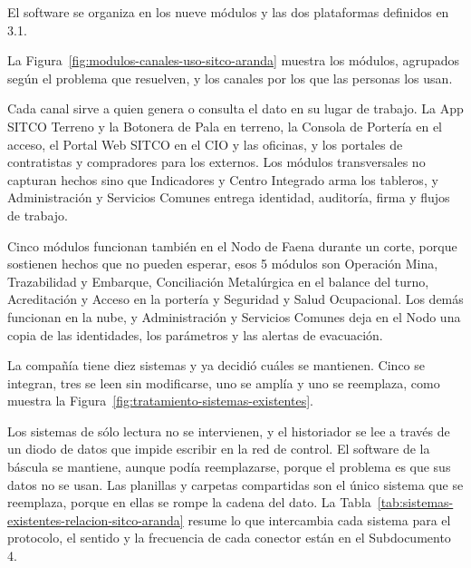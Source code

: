 \documentclass[subdoc]{../../comun/overfore}
\begin{document}
El software se organiza en los nueve módulos y las dos plataformas definidos en 3.1.

La Figura~\ref{fig:modulos-canales-uso-sitco-aranda} muestra los módulos, agrupados según el problema que resuelven, y los canales por los que las personas los usan.

\begin{horizontal}
\end{horizontal}
Cada canal sirve a quien genera o consulta el dato en su lugar de trabajo. La App SITCO Terreno y la Botonera de Pala en terreno, la Consola de Portería en el acceso, el Portal Web SITCO en el CIO y las oficinas, y los portales de contratistas y compradores para los externos. Los módulos transversales no capturan hechos sino que Indicadores y Centro Integrado arma los tableros, y Administración y Servicios Comunes entrega identidad, auditoría, firma y flujos de trabajo.

Cinco módulos funcionan también en el Nodo de Faena durante un corte, porque sostienen hechos que no pueden esperar, esos 5 módulos son Operación Mina, Trazabilidad y Embarque, Conciliación Metalúrgica en el balance del turno, Acreditación y Acceso en la portería y Seguridad y Salud Ocupacional. Los demás funcionan en la nube, y Administración y Servicios Comunes deja en el Nodo una copia de las identidades, los parámetros y las alertas de evacuación.

La compañía tiene diez sistemas y ya decidió cuáles se mantienen. Cinco se integran, tres se leen sin modificarse, uno se amplía y uno se reemplaza, como muestra la Figura~\ref{fig:tratamiento-sistemas-existentes}.

\begin{horizontal}
\end{horizontal}
Los sistemas de sólo lectura no se intervienen, y el historiador se lee a través de un diodo de datos que impide escribir en la red de control. El software de la báscula se mantiene, aunque podía reemplazarse, porque el problema es que sus datos no se usan. Las planillas y carpetas compartidas son el único sistema que se reemplaza, porque en ellas se rompe la cadena del dato. La Tabla~\ref{tab:sistemas-existentes-relacion-sitco-aranda} resume lo que intercambia cada sistema para el protocolo, el sentido y la frecuencia de cada conector están en el Subdocumento 4.
\end{document}

